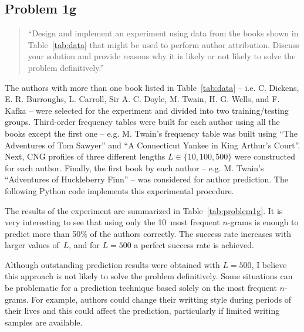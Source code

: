 \documentclass[conference]{IEEEtran}
\newcommand{\codefile}[1]{
  \begin{framed}
  \fontsize{5.65}{6.78}\selectfont
  
  \end{framed}
}
\begin{document}
\subsection{Problem 1g}

\begin{quote}
``Design and implement an experiment using data from the books shown in Table~\ref{tab:data} that might be used to perform author attribution. 
Discuss your solution and provide reasons why it is likely or not likely to solve the problem definitively.''
\end{quote}
\vspace{0.75em}

The authors with more than one book listed in Table~\ref{tab:data} 
-- i.e. C. Dickens, E. R. Burroughs, L. Carroll, Sir A. C. Doyle, M. Twain, H. G. Wells, and F. Kafka -- 
were selected for the experiment and divided into two training/testing groups.
Third-order frequency tables were built for each author using all the books except the first one 
-- e.g. M. Twain's frequency table was built using ``The Adventures of Tom Sawyer'' and ``A Connecticut Yankee in King Arthur's Court''.
Next, CNG profiles of three different lengths $L\in\{10,100,500\}$ were constructed for each author.
Finally, the first book by each author 
-- e.g. M. Twain's ``Adventures of Huckleberry Finn'' -- 
was considered for author prediction. 
The following Python code implements this experimental procedure.

\codefile{problem1g.py}

The results of the experiment are summarized in Table~\ref{tab:problem1g}.
It is very interesting to see that using only the 10~most frequent \mbox{$n$-grams} is enough to predict more than 50\% of the authors correctly.
The success rate increases with larger values of~$L$, and for $L=500$ a perfect success rate is achieved.

Although outstanding prediction results were obtained with $L=500$, I believe this approach is not likely to solve the problem definitively.
Some situations can be problematic for a prediction technique based solely on the most frequent \mbox{$n$-grams}.
For example, authors could change their writting style during periods of their lives and this could affect the prediction, particularly if limited writing samples are available.
\end{document}

